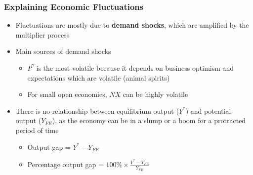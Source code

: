 \documentclass{article}
\begin{document}
\begin{multicols}{2}
\subsubsection{Explaining Economic Fluctuations}
\begin{itemize}
	\item Fluctuations are mostly due to \textbf{demand shocks}, which are amplified by the multiplier process
	\item Main sources of demand shocks
	\begin{itemize}
		\item $I^P$ is the most volatile because it depends on business optimism and expectations which are volatile (animal spirits)
		\item For small open economies, $NX$ can be highly volatile
	\end{itemize}
    \item There is no relationship between equilibrium output ($Y^*$) and potential output ($Y_{FE}$), as the economy can be in a slump or a boom for a protracted period of time
    \begin{itemize}
    	\item Output gap = $Y^* - Y_{FE}$
    	\item Percentage output gap = $100\% \times \frac{Y^* - Y_{FE}}{Y_{FE}}$
    \end{itemize}
\end{itemize}


\end{multicols}
\end{document}

